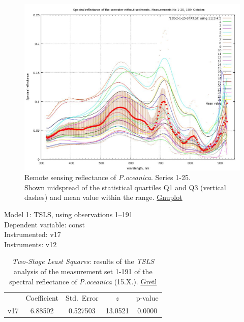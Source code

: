 \documentclass[10pt, a4paper]{article}
\begin{document}
\begin{appendices}
\begin{figure}[H]
	\begin{center}
		\includegraphics[scale=0.25]{GNU-12.jpg}
		\caption{Remote sensing reflectance of \textit{P.oceanica}. Series 1-25. \\Shown midspread of the statistical quartiles Q1 and Q3 (vertical dashes) and mean value within the range.  \href{http://www.gnuplot.info/}{Gnuplot}­}
		\label{fig:A.26}
	\end{center}
\end{figure}

\begin{table}[htbp]
	\caption{\textit{Two-Stage Least Squares}: results of the \textit{TSLS} analysis of the measurement set 1-191 of the spectral reflectance of \textit{P.oceanica} (15.X.). \href{http://gretl.sourceforge.net/}{Gretl}}
	\begin{center}
		Model 1: TSLS, using observations 1--191\\
		Dependent variable: const\\
		Instrumented: v17 \\
		Instruments: v12 \\

	\vspace{1em}

	\begin{tabular}{|c c c c c|}
		  &  {Coefficient} &  {Std.\ Error} &  {$z$} &    {p-value} \\[1ex]
		v17 &  6.88502 & 0.527503 & 13.0521 & 0.0000 \\
	\end{tabular}


\end{center}
\end{table}
\end{appendices}
\end{document}
